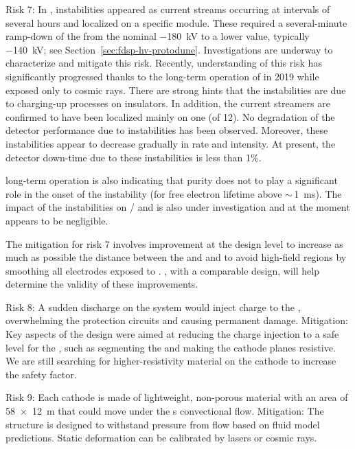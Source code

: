Risk 7:  In ,  instabilities appeared as current streams occurring at intervals of several hours and localized on  a specific  module. These required a several-minute ramp-down of the  from the nominal \SI{-180}{kV} to a lower value, typically \SI{-140}{kV}; see Section~\ref{sec:fdsp-hv-protodune}.
Investigations are underway to characterize and mitigate this risk. Recently, understanding of this risk has significantly progressed thanks to the 
long-term operation of  in 2019 while exposed only to cosmic rays. 
There are strong hints %
that the instabilities are due to charging-up processes on insulators. In addition, %
the current streamers are confirmed to have been localized mainly on %
one  (of 12). No degradation of the detector performance due to  instabilities has been observed. %
Moreover, these instabilities appear to decrease gradually in rate and intensity. At present, the detector down-time due to these instabilities is less than 1\%.  

 long-term operation is also indicating that  purity does not %
to play a significant role in the onset of the  instability (for free electron lifetime above $\sim\,$\SI{1}{ms}).  The impact of the  instabilities on / and  is also under investigation and at the moment appears to be negligible.

The mitigation for risk 7 involves improvement at the design level to increase as much as possible the distance between the  and  and to avoid high-field regions by smoothing all electrodes exposed to .  %
, with a comparable design, will help determine %
the validity of these improvements.

Risk 8: A sudden discharge on the  system would inject charge to the  , overwhelming the protection circuits and causing permanent damage. Mitigation: Key aspects of the  design were aimed at reducing the charge injection to a safe level for the , such as segmenting the  and making the cathode planes resistive.  We are still searching for higher-resistivity material on the cathode to increase the safety factor. 

Risk 9:  Each cathode is made of lightweight, non-porous material with an area of \SI{58x12}{m} that could move under the s convectional flow.  Mitigation: The  structure is designed to withstand pressure from  flow based on fluid model predictions. Static deformation can be calibrated by lasers or cosmic rays.

